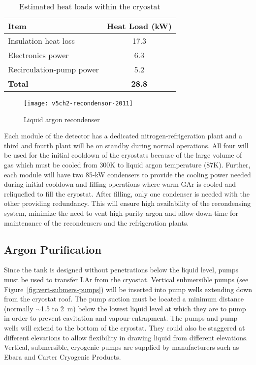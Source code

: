 \begin{table}
\centering
\caption{Estimated heat loads within the cryostat}
\label{table:cryo-heat-loads}
\begin{tabular}[htbp]{|l|c|}
\hline
{\bf Item} & {\bf Heat Load (kW)}\\
\hline
Insulation heat loss & 17.3  \\
\hline
Electronics power & 6.3  \\
\hline
Recirculation-pump power & 5.2  \\
\hline
{\bf Total} & {\bf 28.8 } \\
\hline
\end{tabular} 
\end{table}


\begin{figure}[htbp]
\centering
\texttt{[image: v5ch2-recondensor-2011]}
\caption{Liquid argon recondenser}
\label{fig:v5ch2-recondenser-sept-2011}
\end{figure}

Each module of the detector has a dedicated nitrogen-refrigeration plant 
 and a third and fourth plant will be on standby during normal operations. All four will be used
for the initial cooldown of the cryostats
because of the large volume of gas which must be cooled from 300K to liquid
argon temperature (87K). Further, each module will
have two 85-kW condensers to provide the
cooling power needed during initial cooldown and filling operations where warm GAr
is cooled and reliquefied to fill the cryostat.
After filling, only one condenser is needed with the
other providing redundancy.
This will ensure high availability of the recondensing system, minimize the need to vent high-purity argon and allow down-time for maintenance of
the recondensers and the refrigeration plants. 

\subsection{Argon Purification}
\label{subsec:argon-pur}
Since the tank is designed without penetrations below the liquid level, pumps must be used to transfer LAr from the cryostat.  Vertical submersible 
pumps (see Figure~\ref{fig:vert-submers-pumps}) will be inserted into pump wells extending down from the cryostat roof.  The pump suction 
must be located a minimum distance (normally $\sim$1.5 to 2~m) below 
the lowest liquid level at which they are to pump in order to prevent cavitation and vapour-entrapment. 
The pumps and pump wells will extend to the bottom of the cryostat.  They 
could also be staggered at different elevations to allow flexibility in drawing liquid from different 
elevations. Vertical, submersible, cryogenic pumps are supplied by manufacturers such as Ebara and 
Carter Cryogenic Products.


